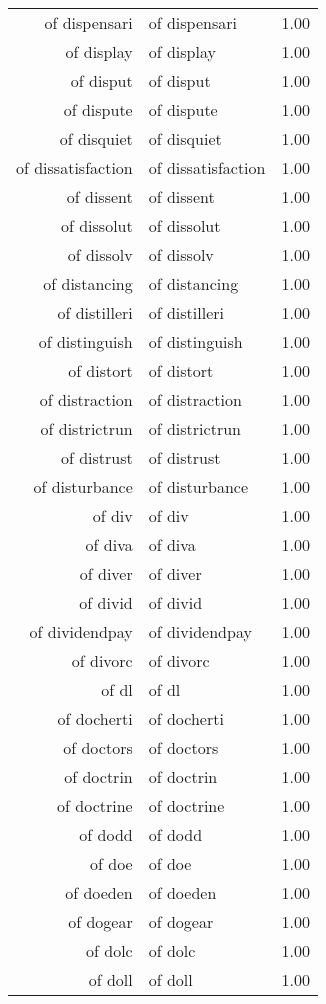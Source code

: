 \begin{table}[ht]
\begin{tabular}{rlr}
  of dispensari & of dispensari & 1.00 \\ 
  of display & of display & 1.00 \\ 
  of disput & of disput & 1.00 \\ 
  of dispute & of dispute & 1.00 \\ 
  of disquiet & of disquiet & 1.00 \\ 
  of dissatisfaction & of dissatisfaction & 1.00 \\ 
  of dissent & of dissent & 1.00 \\ 
  of dissolut & of dissolut & 1.00 \\ 
  of dissolv & of dissolv & 1.00 \\ 
  of distancing & of distancing & 1.00 \\ 
  of distilleri & of distilleri & 1.00 \\ 
  of distinguish & of distinguish & 1.00 \\ 
  of distort & of distort & 1.00 \\ 
  of distraction & of distraction & 1.00 \\ 
  of districtrun & of districtrun & 1.00 \\ 
  of distrust & of distrust & 1.00 \\ 
  of disturbance & of disturbance & 1.00 \\ 
  of div & of div & 1.00 \\ 
  of diva & of diva & 1.00 \\ 
  of diver & of diver & 1.00 \\ 
  of divid & of divid & 1.00 \\ 
  of dividendpay & of dividendpay & 1.00 \\ 
  of divorc & of divorc & 1.00 \\ 
  of dl & of dl & 1.00 \\ 
  of docherti & of docherti & 1.00 \\ 
  of doctors & of doctors & 1.00 \\ 
  of doctrin & of doctrin & 1.00 \\ 
  of doctrine & of doctrine & 1.00 \\ 
  of dodd & of dodd & 1.00 \\ 
  of doe & of doe & 1.00 \\ 
  of doeden & of doeden & 1.00 \\ 
  of dogear & of dogear & 1.00 \\ 
  of dolc & of dolc & 1.00 \\ 
  of doll & of doll & 1.00 \\ 

\end{tabular}
\end{table}
